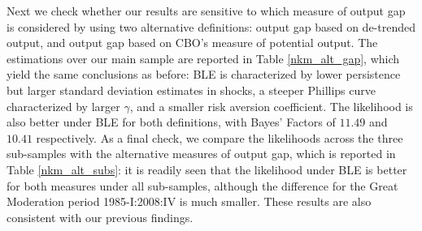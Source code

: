 Next we check whether our results are sensitive to which measure of output gap is considered by using two alternative definitions: output gap based on de-trended output, 
and output gap based on CBO's measure of potential output. The estimations over our main sample are reported in Table \ref{nkm_alt_gap}, which yield the same conclusions as before:  BLE is characterized by lower persistence but larger standard deviation estimates in shocks, a steeper Phillips curve characterized by larger $\gamma$, and a smaller risk aversion coefficient. The likelihood is also better under BLE for both definitions, with Bayes' Factors of $11.49$ and $10.41$ respectively. As a final check, we compare the likelihoods across the three sub-samples with the alternative measures of output gap, which is reported in Table \ref{nkm_alt_subs}: it is readily seen that the likelihood under BLE is better for both measures under all sub-samples, although the difference for the Great Moderation period 1985-I:2008:IV is much smaller. These results are also consistent with our previous findings. \\




